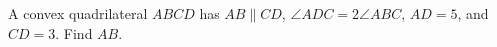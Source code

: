 A convex quadrilateral $ABCD$ has $AB\parallel CD$, $\angle ADC=2\angle ABC$, $AD=5$, and $CD=3$. Find $AB$.

